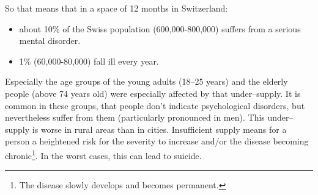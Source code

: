 \documentclass[../main.tex]{subfiles}
\begin{document}
So that means that in a space of 12 months in Switzerland:
\begin{itemize}
	\item about 10\% of the Swiss population (600,000-800,000) suffers from a serious mental disorder.
	\item 1\% (60,000-80,000) fall ill every year.
\end{itemize}

Especially the age groups of the young adults (18--25 years) and the elderly people (above 74 years old) were especially affected by that under--supply. 
It is common in these groups, that people don't indicate psychological disorders, but nevertheless suffer from them (particularly pronounced in men). This under--supply is worse in rural areas than in cities.
Insufficient supply means for a person a heightened risk for the severity to increase and/or the disease becoming chronic\footnote{The disease slowly develops and becomes permanent.}. 
In the worst cases, this can lead to suicide.
\end{document}
